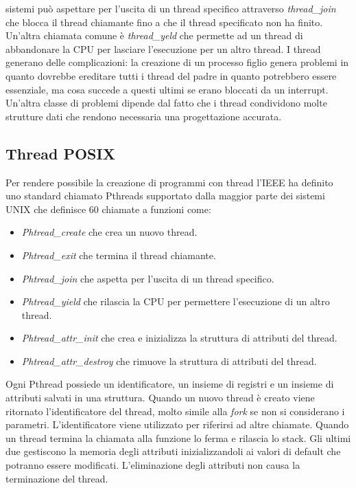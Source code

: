 sistemi pu\`o aspettare per l'uscita di un thread specifico attraverso \emph{thread\_join} che blocca il thread chiamante fino a che il thread specificato non ha finito. Un'altra
chiamata comune \`e \emph{thread\_yeld} che permette ad un thread di abbandonare la CPU per lasciare l'esecuzione per un altro thread. I thread generano delle complicazioni: la
creazione di un processo figlio genera problemi in quanto dovrebbe ereditare tutti i thread del padre in quanto potrebbero essere essenziale, ma cosa succede a questi ultimi se erano
bloccati da un interrupt. Un'altra classe di problemi dipende dal fatto che i thread condividono molte strutture dati che rendono necessaria una progettazione accurata.
\subsection{Thread POSIX}
Per rendere possibile la creazione di programmi con thread l'IEEE ha definito uno standard chiamato Pthreads supportato dalla maggior parte dei sistemi UNIX che definisce $60$ chiamate
a funzioni come:
\begin{itemize}
	\item \emph{Phtread\_create} che crea un nuovo thread.
	\item \emph{Phtread\_exit} che termina il thread chiamante.
	\item \emph{Phtread\_join} che aspetta per l'uscita di un thread specifico.
	\item \emph{Phtread\_yield} che rilascia la CPU per permettere l'esecuzione di un altro thread.
	\item \emph{Phtread\_attr\_init} che crea e inizializza la struttura di attributi del thread.
	\item \emph{Phtread\_attr\_destroy} che rimuove la struttura di attributi del thread.
\end{itemize}
Ogni Pthread possiede un identificatore, un insieme di registri e un insieme di attributi salvati in una struttura. Quando un nuovo thread \`e creato viene ritornato l'identificatore del
thread, molto simile alla \emph{fork} se non si considerano i parametri. L'identificatore viene utilizzato per riferirsi ad altre chiamate. Quando un thread termina la chiamata alla
funzione lo ferma e rilascia lo stack. Gli ultimi due gestiscono la memoria degli attributi inizializzandoli ai valori di default che potranno essere modificati. L'eliminazione degli
attributi non causa la terminazione del thread.
